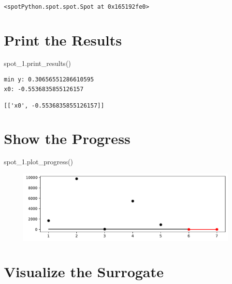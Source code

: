 \documentclass[
  letterpaper,
  DIV=11,
  numbers=noendperiod]{scrreprt}
\newenvironment{Shaded}{\begin{snugshade}}{\end{snugshade}}
\newcommand{\NormalTok}[1]{\textcolor[rgb]{0.00,0.23,0.31}{#1}}
\begin{document}
\begin{verbatim}
<spotPython.spot.spot.Spot at 0x165192fe0>
\end{verbatim}

\hypertarget{print-the-results-5}{%
\section{Print the Results}\label{print-the-results-5}}

\begin{Shaded}
\begin{Highlighting}[]
\NormalTok{spot\_1.print\_results()}
\end{Highlighting}
\end{Shaded}

\begin{verbatim}
min y: 0.30656551286610595
x0: -0.5536835855126157
\end{verbatim}

\begin{verbatim}
[['x0', -0.5536835855126157]]
\end{verbatim}

\hypertarget{show-the-progress-2}{%
\section{Show the Progress}\label{show-the-progress-2}}

\begin{Shaded}
\begin{Highlighting}[]
\NormalTok{spot\_1.plot\_progress()}
\end{Highlighting}
\end{Shaded}

\begin{figure}[H]

{\centering \includegraphics{99_spot_doc_files/figure-pdf/cell-8-output-1.pdf}

}

\end{figure}

\hypertarget{visualize-the-surrogate}{%
\section{Visualize the Surrogate}\label{visualize-the-surrogate}}
\end{document}
